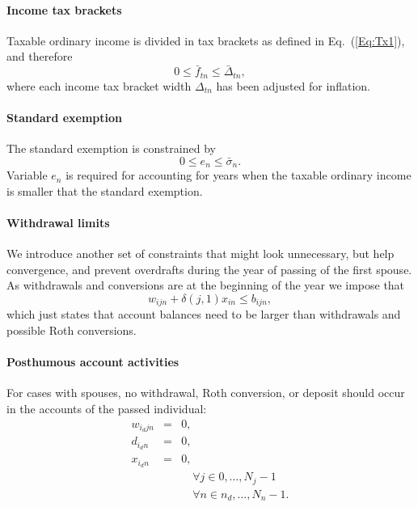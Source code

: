 \documentclass{report}[fleqn,11pt]
\begin{document}
\paragraph*{Income tax brackets}
	Taxable ordinary income is divided in tax brackets as defined in Eq.~(\ref{Eq:Tx1}),
	and therefore
	\begin{equation}
		\label{Eq:C2}
		0 \le \bar{f}_{tn} \le \bar{\Delta}_{tn},
	\end{equation}
	where each income tax bracket width $\Delta_{tn}$ has been adjusted for inflation.

\paragraph*{Standard exemption}
	The standard exemption is constrained by
	\begin{equation}
		0 \le e_n \le \bar{\sigma}_n.
	\end{equation}
	Variable $e_n$ is required for accounting for years when the taxable ordinary
	income is smaller that the standard exemption.

\paragraph*{Withdrawal limits}
	We introduce another set of constraints that might look unnecessary, but help
	convergence, and prevent overdrafts during the year of passing of the first spouse.
	As withdrawals and conversions are at the beginning of the year 
	we impose that
	\begin{equation}
		w_{ijn} + \delta(j, 1)x_{in} \le b_{ijn},
	\end{equation}
	which just states that account balances need to be larger than withdrawals and possible Roth conversions.

\paragraph*{Posthumous account activities}
	For cases with spouses, no withdrawal, Roth conversion, or deposit should
	occur in the accounts of the passed individual:
	\begin{eqnarray}
		w_{i_djn} &=& 0,\nonumber\\
		d_{i_dn} &=& 0, \nonumber \\
		x_{i_dn} &=& 0, \nonumber \\
		&& \quad \forall j \in {0, \ldots, N_j-1} \nonumber \\
		&& \quad \forall n \in {n_d, \ldots, N_n-1}.
	\end{eqnarray}
\end{document}
